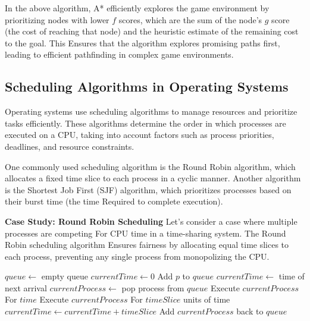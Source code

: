 \documentclass[12pt]{book} %
\begin{document}
In the above algorithm, A* efficiently explores the game environment by prioritizing nodes with lower $f$ scores, which are the sum of the node's $g$ score (the cost of reaching that node) and the heuristic estimate of the remaining cost to the goal. This Ensures that the algorithm explores promising paths first, leading to efficient pathfinding in complex game environments.

\subsection{Scheduling Algorithms in Operating Systems}
Operating systems use scheduling algorithms to manage resources and prioritize tasks efficiently. These algorithms determine the order in which processes are executed on a CPU, taking into account factors such as process priorities, deadlines, and resource constraints.

One commonly used scheduling algorithm is the Round Robin algorithm, which allocates a fixed time slice to each process in a cyclic manner. Another algorithm is the Shortest Job First (SJF) algorithm, which prioritizes processes based on their burst time (the time Required to complete execution).

\textbf{Case Study: Round Robin Scheduling}
Let's consider a case where multiple processes are competing For CPU time in a time-sharing system. The Round Robin scheduling algorithm Ensures fairness by allocating equal time slices to each process, preventing any single process from monopolizing the CPU.

\FloatBarrier
\begin{algorithm}
\caption{Round Robin Scheduling}
\begin{algorithmic}[1]
    \State $queue \gets$ empty queue
    \State $currentTime \gets 0$
                \State Add $p$ to $queue$
            \EndIf
        \EndFor
            \State $currentTime \gets$ time of next arrival
        \Else
            \State $currentProcess \gets$ pop process from $queue$
            \State Execute $currentProcess$ For $time$
            \State Execute $currentProcess$ For $timeSlice$ units of time
                    \State $currentTime \gets currentTime + timeSlice$
                    \State Add $currentProcess$ back to $queue$
                \EndIf
        \EndIf
    \EndWhile
\EndProcedure
\end{algorithmic}
\end{algorithm}
\FloatBarrier
\end{document}
